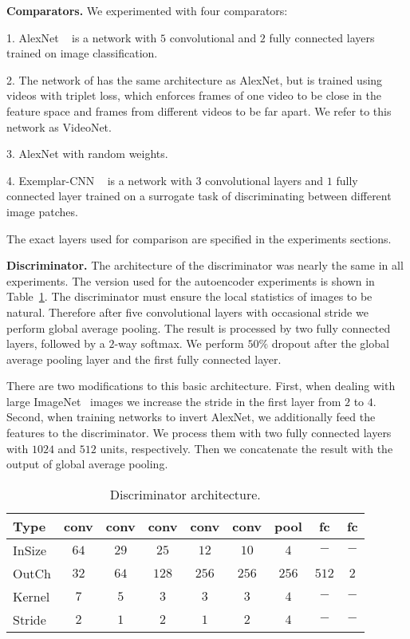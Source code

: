 \documentclass{article}
\begin{document}
\textbf{Comparators.}
We experimented with four comparators:

1. AlexNet ~\citep{Krizhevsky_NIPS2012} is a network with $5$ convolutional and $2$ fully connected layers trained on image classification.

2. The network of \citet{Wang_ICCV2015} has the same architecture as AlexNet, but is trained using videos with triplet loss, which enforces frames of one video to be close in the feature space and frames from different videos to be far apart. We refer to this network as VideoNet.

3. AlexNet with random weights.

4. Exemplar-CNN ~\citep{Exemplar_PAMI2015} is a network with $3$ convolutional layers and $1$ fully connected layer trained on a surrogate task of discriminating between different image patches.

The exact layers used for comparison are specified in the experiments sections.

\textbf{Discriminator.} The architecture of the discriminator was nearly the same in all experiments.
The version used for the autoencoder experiments is shown in Table~\ref{tbl:discriminator_arch}.
The discriminator must ensure the local statistics of images to be natural.
Therefore after five convolutional layers with occasional stride we perform global average pooling.
The result is processed by two fully connected layers, followed by a $2$-way softmax.
We perform $50 \%$ dropout after the global average pooling layer and the first fully connected layer.

There are two modifications to this basic architecture.
First, when dealing with large ImageNet~\citep{imagenet} images we increase the stride in the first layer from $2$ to $4$.
Second, when training networks to invert AlexNet, we additionally feed the features to the discriminator.
We process them with two fully connected layers with $1024$ and $512$ units, respectively. 
Then we concatenate the result with the output of global average pooling.

\begin{table}
   \begin{center}
   \setlength{\tabcolsep}{0.15cm}
  \small{
  \begin{tabular}{|l|cccccccc|}
      \hline
      \small{Type}   & conv  & conv & conv  & conv  & conv  & pool  & fc    & fc   \\ \hline
      \small{InSize} & $64$  & $29$ & $25$  & $12$  & $10$  & $4$   & $-$   & $-$  \\
      \small{OutCh}  & $32$  & $64$ & $128$ & $256$ & $256$ & $256$ & $512$ & $2$  \\
      \small{Kernel}    & $7$   & $5$  & $3$   & $3$   & $3$   & $4$   & $-$   & $-$  \\
      \small{Stride}    & $2$   & $1$  & $2$   & $1$   & $2$   & $4$   & $-$   & $-$  \\
      \hline
    \end{tabular}}
  \end{center}
  \caption{Discriminator architecture. }
  \label{tbl:discriminator_arch}
\end{table}
\end{document}
